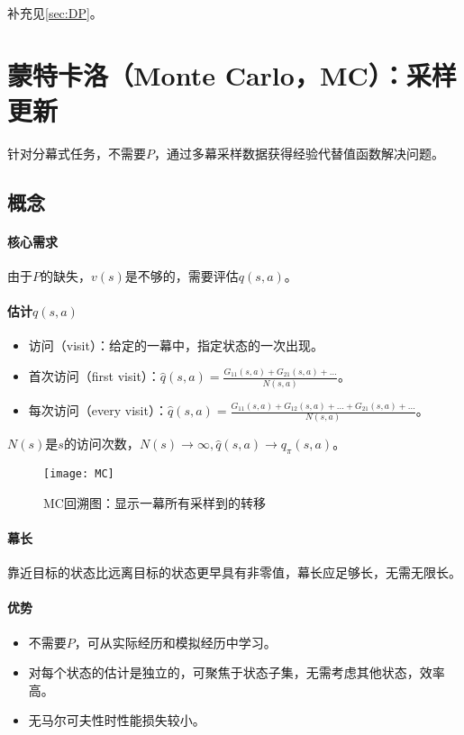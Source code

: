 \documentclass[
12pt, %
a4paper, 
oneside, %
headinclude,footinclude, %
]{scrartcl}
\begin{document}
补充见\ref{sec:DP}。
\section[蒙特卡洛]{蒙特卡洛（Monte Carlo，MC）：采样更新}
针对分幕式任务，不需要$ P $，通过多幕采样数据获得经验代替值函数解决问题。
\subsection[概念]{概念}
\paragraph{核心需求}
由于$ P $的缺失，$ v(s) $是不够的，需要评估$ q(s, a) $。
\paragraph{估计$ q(s, a) $}
\begin{itemize}
\item 访问（visit）：给定的一幕中，指定状态的一次出现。
\item 首次访问（first visit）：$ \hat{q}(s, a) = \frac{G_{11}(s, a) + G_{21}(s, a) + \dots}{N(s, a)} $。
\item 每次访问（every visit）：$ \hat{q}(s, a) = \frac{G_{11}(s, a) + G_{12}(s, a) + \dots + G_{21}(s, a) + \dots}{N(s, a)} $。
\end{itemize}

$ N(s) $是$ s $的访问次数，$ N(s) \to \infty, \hat{q}(s, a) \to q_{\pi}(s, a) $。

\begin{figure}[H]
\centering 
\texttt{[image: MC]} 
\caption[MC回溯图：显示一幕所有采样到的转移]{MC回溯图：显示一幕所有采样到的转移}
\end{figure}
\paragraph{幕长}
靠近目标的状态比远离目标的状态更早具有非零值，幕长应足够长，无需无限长。
\paragraph{优势}
\begin{itemize}
\item 不需要$ P $，可从实际经历和模拟经历中学习。
\item 对每个状态的估计是独立的，可聚焦于状态子集，无需考虑其他状态，效率高。
\item 无马尔可夫性时性能损失较小。
\end{itemize}
\end{document}
